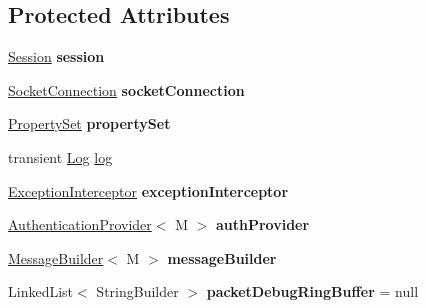 \subsection*{Protected Attributes}
\begin{DoxyCompactItemize}
\item 
\mbox{\label{classcom_1_1mysql_1_1cj_1_1protocol_1_1_abstract_protocol_a6ec300f5f577fdb6d042e361b7b5c0f6}} 
\mbox{\hyperlink{interfacecom_1_1mysql_1_1cj_1_1_session}{Session}} {\bfseries session}
\item 
\mbox{\label{classcom_1_1mysql_1_1cj_1_1protocol_1_1_abstract_protocol_a0c3af4e90e3533ff217b0c1d1f238f2d}} 
\mbox{\hyperlink{interfacecom_1_1mysql_1_1cj_1_1protocol_1_1_socket_connection}{Socket\+Connection}} {\bfseries socket\+Connection}
\item 
\mbox{\label{classcom_1_1mysql_1_1cj_1_1protocol_1_1_abstract_protocol_a54dc78f51d6cf3388dfbee5b36814382}} 
\mbox{\hyperlink{interfacecom_1_1mysql_1_1cj_1_1conf_1_1_property_set}{Property\+Set}} {\bfseries property\+Set}
\item 
transient \mbox{\hyperlink{interfacecom_1_1mysql_1_1cj_1_1log_1_1_log}{Log}} \mbox{\hyperlink{classcom_1_1mysql_1_1cj_1_1protocol_1_1_abstract_protocol_a3c27ad2f43100d6650c4a71b833190cc}{log}}
\item 
\mbox{\label{classcom_1_1mysql_1_1cj_1_1protocol_1_1_abstract_protocol_ab5ecaec9f4472c0cf0d01e4929e0f61e}} 
\mbox{\hyperlink{interfacecom_1_1mysql_1_1cj_1_1exceptions_1_1_exception_interceptor}{Exception\+Interceptor}} {\bfseries exception\+Interceptor}
\item 
\mbox{\label{classcom_1_1mysql_1_1cj_1_1protocol_1_1_abstract_protocol_ae55f145d34e30891a841208ec5164c26}} 
\mbox{\hyperlink{interfacecom_1_1mysql_1_1cj_1_1protocol_1_1_authentication_provider}{Authentication\+Provider}}$<$ M $>$ {\bfseries auth\+Provider}
\item 
\mbox{\label{classcom_1_1mysql_1_1cj_1_1protocol_1_1_abstract_protocol_ad3f57d361262a559460fa992800e3ca8}} 
\mbox{\hyperlink{interfacecom_1_1mysql_1_1cj_1_1_message_builder}{Message\+Builder}}$<$ M $>$ {\bfseries message\+Builder}
\item 
\mbox{\label{classcom_1_1mysql_1_1cj_1_1protocol_1_1_abstract_protocol_a31e42f9f4426a1ca7e55e2d2d1fc6cce}} 
Linked\+List$<$ String\+Builder $>$ {\bfseries packet\+Debug\+Ring\+Buffer} = null
\end{DoxyCompactItemize}


